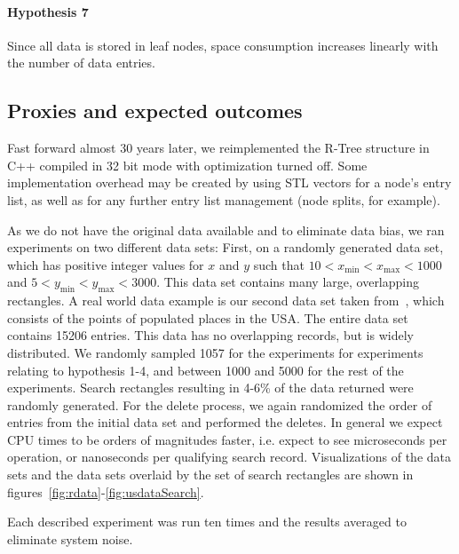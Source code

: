 \paragraph{Hypothesis 7}
Since all data is stored in leaf nodes, space consumption increases linearly with the number of data entries. 

\subsection{Proxies and expected outcomes}
Fast forward almost 30 years later, we reimplemented the R-Tree structure in C++ compiled in 32 bit mode with optimization turned off. Some implementation overhead may be created by using STL vectors for a node's entry list, as well as for any further entry list management (node splits, for example).

As we do not have the original data available and to eliminate data bias, we ran experiments on two different data sets: First, on a randomly generated data set, which has positive integer values for $x$ and $y$ such that $10 < x_{\mathrm{min}} < x_{\mathrm{max}} < 1000$ and  $5 < y_{\mathrm{min}} < y_{\mathrm{max}} < 3000$. This data set contains many large, overlapping rectangles. A real world data example is our second data set taken from~\cite{Online:usppdata}, which consists of the points of populated places in the USA. The entire data set contains 15206 entries. This data has no overlapping records, but is widely distributed. We randomly sampled 1057 for the experiments for experiments relating to hypothesis 1-4, and between 1000 and 5000 for the rest of the experiments. Search rectangles resulting in 4-6\% of the data returned were randomly generated. For the delete process, we again randomized the order of entries from the initial data set and performed the deletes. In general we expect CPU times to be orders of magnitudes faster, i.e. expect to see microseconds per operation, or nanoseconds per qualifying search record. Visualizations of the data sets and the data sets overlaid by the set of search rectangles are shown in figures~\ref{fig:rdata}-\ref{fig:usdataSearch}.

Each described experiment was run ten times and the results averaged to eliminate system noise.

